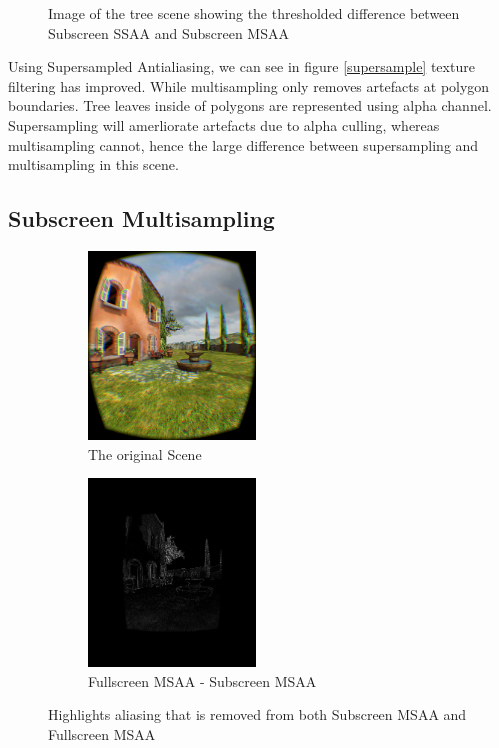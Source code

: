 \documentclass[12pt,a4paper,twoside,openright]{report}
\begin{document}
\begin{figure}
\caption{Image of the tree scene showing the thresholded difference between Subscreen SSAA and Subscreen MSAA}
\label{fig:supersample}
\end{figure}

Using Supersampled Antialiasing, we can see in figure \ref{supersample} texture filtering has improved. While multisampling only removes artefacts at polygon boundaries. Tree leaves inside of polygons are represented using alpha channel. Supersampling will amerliorate artefacts due to alpha culling, whereas multisampling cannot, hence the large difference between supersampling and multisampling in this scene.

\clearpage

\subsection{Subscreen Multisampling}

\begin{figure}[tbh]

\begin{subfigure}{0.5\textwidth}
\includegraphics[width=0.9\linewidth, height=5cm]{figs/noantialiasing.png}
\caption{The original Scene}
\label{fig:subim2}
\end{subfigure}
\begin{subfigure}{0.5\textwidth}
\includegraphics[width=0.9\linewidth, height=5cm]{figs/fullscreenminussubscreenmsaa.png} 
\caption{Fullscreen MSAA - Subscreen MSAA}
\label{fig:subim1}
\end{subfigure}
 
\caption{Highlights aliasing that is removed from both Subscreen MSAA and Fullscreen MSAA}
\label{fig:multisample}
\end{figure}
\end{document}
